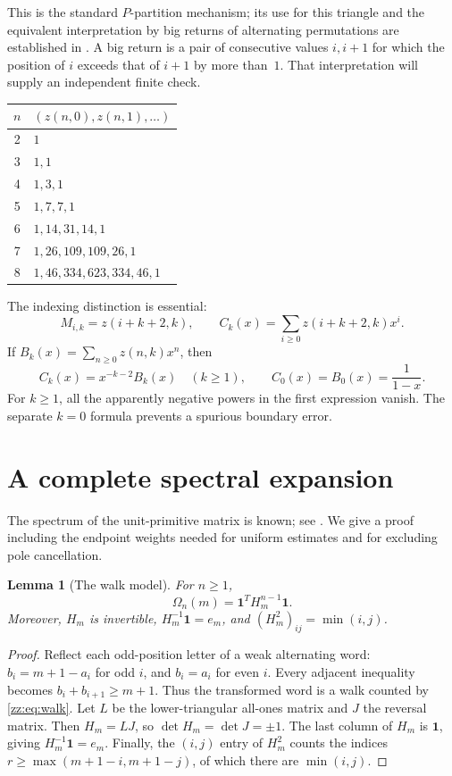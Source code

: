 \documentclass[11pt,a4paper]{article}
\newtheorem{lemma}[theorem]{Lemma}
\theoremstyle{definition}
\newcommand{\Om}{\Omega}
\newcommand{\one}{\mathbf{1}}
\begin{document}
This is the standard $P$-partition mechanism; its use for this triangle and
the equivalent interpretation by big returns of alternating permutations are
established in \cite{pz}.  A big return is a pair of consecutive values
$i,i+1$ for which the position of $i$ exceeds that of $i+1$ by more than~$1$.
That interpretation will supply an independent finite check.

\begin{center}
\begin{tabular}{cl}
\toprule
$n$ & $(z(n,0),z(n,1),\ldots)$\\
\midrule
2 & $1$\\
3 & $1,1$\\
4 & $1,3,1$\\
5 & $1,7,7,1$\\
6 & $1,14,31,14,1$\\
7 & $1,26,109,109,26,1$\\
8 & $1,46,334,623,334,46,1$\\
\bottomrule
\end{tabular}
\end{center}
The indexing distinction is essential:
\begin{equation}\label{zz:eq:indexing}
 M_{i,k}=z(i+k+2,k),\qquad
 C_k(x)=\sum_{i\ge0}z(i+k+2,k)x^i.
\end{equation}
If $B_k(x)=\sum_{n\ge0}z(n,k)x^n$, then
\begin{equation}\label{zz:eq:shift}
 C_k(x)=x^{-k-2}B_k(x)\quad(k\ge1),\qquad
 C_0(x)=B_0(x)=\frac1{1-x}.
\end{equation}
For $k\ge1$, all the apparently negative powers in the first expression
vanish.  The separate $k=0$ formula prevents a spurious boundary error.

\section{A complete spectral expansion}
\label{zz:sec:spectrum}
The spectrum of the unit-primitive matrix is known; see \cite{xz}.
We give a proof including the endpoint weights needed for uniform estimates
and for excluding pole cancellation.

\begin{lemma}[The walk model]
\label{zz:lem:walk}
For $n\ge1$,
\begin{equation}\label{zz:eq:walk}
 \Om_n(m)=\one^T H_m^{n-1}\one.
\end{equation}
Moreover, $H_m$ is invertible,
$H_m^{-1}\one=e_m$, and $(H_m^2)_{ij}=\min(i,j)$.
\end{lemma}
\begin{proof}
Reflect each odd-position letter of a weak alternating word:
$b_i=m+1-a_i$ for odd $i$, and $b_i=a_i$ for even $i$.
Every adjacent inequality becomes $b_i+b_{i+1}\ge m+1$.
Thus the transformed word is a walk counted by \eqref{zz:eq:walk}.
Let $L$ be the lower-triangular all-ones matrix and $J$ the reversal matrix.
Then $H_m=LJ$, so $\det H_m=\det J=\pm1$.
The last column of $H_m$ is $\one$, giving $H_m^{-1}\one=e_m$.
Finally, the $(i,j)$ entry of $H_m^2$ counts the indices
$r\ge\max(m+1-i,m+1-j)$, of which there are $\min(i,j)$.
\end{proof}
\end{document}
